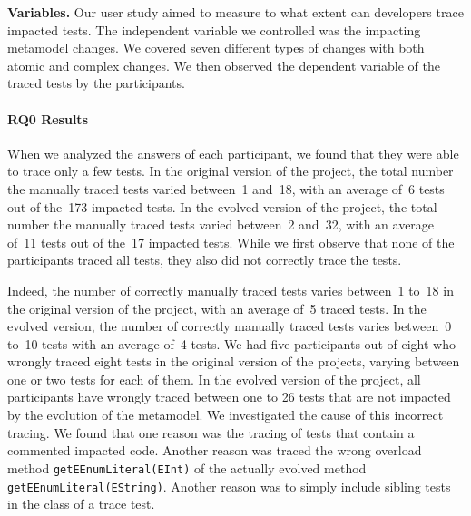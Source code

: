 {	\textbf{Variables.} Our user study aimed to measure to what extent can developers trace impacted tests. The independent variable we controlled was the impacting metamodel changes. We covered seven different types of changes with both atomic and complex changes. 
	We then observed the dependent variable of the traced tests by the participants. 
	
	\paragraph{RQ0 Results}
	When we analyzed the answers of each participant, we found that they were able to trace only a few tests. In the original version of the project, the total number the manually traced tests varied between~1 and~18, with an average of~6 tests out of the~173 impacted tests.   
	In the evolved version of the project, the total number the manually traced tests varied between~2 and~32, with an average of~11 tests out of the~17 impacted tests.   
	While we first observe that none of the participants traced all tests, they also did not correctly trace the tests. 
	
	Indeed, the number of correctly manually traced tests varies between~1 to~18 in the original version of the project, with an average of~5 traced tests. In the evolved version, the number of correctly manually traced tests varies between~0 to~10 tests with an average of~4 tests. 
	We had five participants out of eight who wrongly traced eight tests in the original version of the projects, varying between one or two tests for each of them. In the evolved version of the project, all participants have wrongly traced between one to 26 tests that are not impacted by the evolution of the metamodel. 
	We investigated the cause of this incorrect tracing. We found that one reason was the tracing  of tests that contain a commented impacted code. 
	Another reason was traced the wrong overload method \texttt{getEEnumLiteral(EInt)} of the actually evolved method \texttt{getEEnumLiteral(EString)}. Another reason was to simply include sibling tests in the class of a trace test. 
	
}
